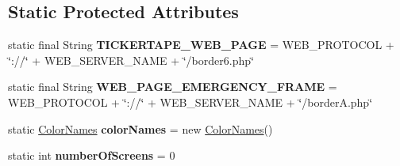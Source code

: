 \subsection*{Static Protected Attributes}
\begin{DoxyCompactItemize}
\item 
\hypertarget{classgov_1_1fnal_1_1ppd_1_1dd_1_1display_1_1client_1_1ConnectionToBrowserInstance_a07f932b29a0bdeb7c0811fd0f815afbb}{static final String {\bfseries T\-I\-C\-K\-E\-R\-T\-A\-P\-E\-\_\-\-W\-E\-B\-\_\-\-P\-A\-G\-E} = W\-E\-B\-\_\-\-P\-R\-O\-T\-O\-C\-O\-L + \char`\"{}\-://\char`\"{} + W\-E\-B\-\_\-\-S\-E\-R\-V\-E\-R\-\_\-\-N\-A\-M\-E + \char`\"{}/border6.\-php\char`\"{}}\label{classgov_1_1fnal_1_1ppd_1_1dd_1_1display_1_1client_1_1ConnectionToBrowserInstance_a07f932b29a0bdeb7c0811fd0f815afbb}

\item 
\hypertarget{classgov_1_1fnal_1_1ppd_1_1dd_1_1display_1_1client_1_1ConnectionToBrowserInstance_a1081b866c3ae5aa9f6fe831ea3484d2c}{static final String {\bfseries W\-E\-B\-\_\-\-P\-A\-G\-E\-\_\-\-E\-M\-E\-R\-G\-E\-N\-C\-Y\-\_\-\-F\-R\-A\-M\-E} = W\-E\-B\-\_\-\-P\-R\-O\-T\-O\-C\-O\-L + \char`\"{}\-://\char`\"{} + W\-E\-B\-\_\-\-S\-E\-R\-V\-E\-R\-\_\-\-N\-A\-M\-E + \char`\"{}/border\-A.\-php\char`\"{}}\label{classgov_1_1fnal_1_1ppd_1_1dd_1_1display_1_1client_1_1ConnectionToBrowserInstance_a1081b866c3ae5aa9f6fe831ea3484d2c}

\item 
\hypertarget{classgov_1_1fnal_1_1ppd_1_1dd_1_1display_1_1client_1_1ConnectionToBrowserInstance_a519ae3dcdae79f106e41b5d7887c992b}{static \hyperlink{classgov_1_1fnal_1_1ppd_1_1dd_1_1util_1_1nonguiUtils_1_1ColorNames}{Color\-Names} {\bfseries color\-Names} = new \hyperlink{classgov_1_1fnal_1_1ppd_1_1dd_1_1util_1_1nonguiUtils_1_1ColorNames}{Color\-Names}()}\label{classgov_1_1fnal_1_1ppd_1_1dd_1_1display_1_1client_1_1ConnectionToBrowserInstance_a519ae3dcdae79f106e41b5d7887c992b}

\item 
\hypertarget{classgov_1_1fnal_1_1ppd_1_1dd_1_1display_1_1client_1_1ConnectionToBrowserInstance_a7366adfc07c9163c5f6efcbc0c3985b7}{static int {\bfseries number\-Of\-Screens} = 0}\label{classgov_1_1fnal_1_1ppd_1_1dd_1_1display_1_1client_1_1ConnectionToBrowserInstance_a7366adfc07c9163c5f6efcbc0c3985b7}

\end{DoxyCompactItemize}


